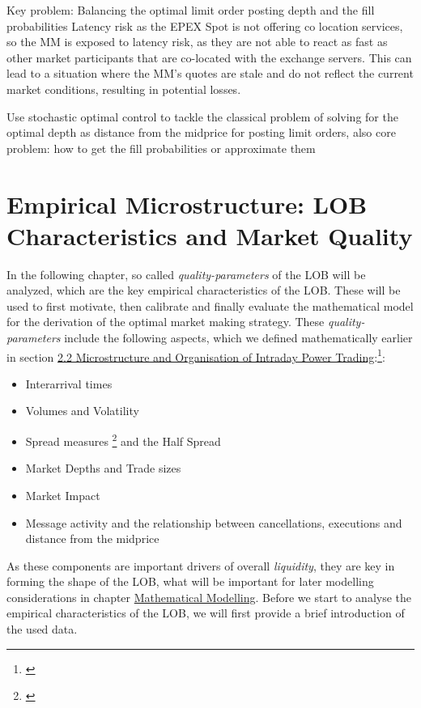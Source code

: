 \documentclass[12pt,a4paper]{cau_thesis}
\begin{document}
Key problem: Balancing the optimal limit order posting depth and the
fill probabilities Latency risk as the EPEX Spot is not offering co
location services, so the MM is exposed to latency risk, as they are
not able to react as fast as other market participants that are
co-located with the exchange servers. This can lead to a situation
where the MM's quotes are stale and do not reflect the current market
conditions, resulting in potential losses.

Use stochastic optimal control to tackle the classical problem of
solving for the optimal depth as distance from the midprice for
posting limit orders, also core problem: how to get the fill
probabilities or approximate them
\chapter{Empirical Microstructure: LOB Characteristics and Market Quality}\label{ch:empirical_characteristics}
In the following chapter, so called \textit{quality-parameters} of
the LOB will be analyzed, which are the key empirical characteristics
of the LOB. These will be used to first motivate, then calibrate and
finally evaluate the mathematical model for the derivation of the
optimal market making strategy. These \textit{quality-parameters}
include the following aspects, which we defined mathematically
earlier in section
\hyperref[sec:microstructure_and_organisation_of_power_trading]{2.2
    Microstructure and Organisation of Intraday Power
    Trading}:\footnote{\cite[See][, p.61.]{cartea2015algorithmic}}:
\begin{itemize}
    \item Interarrival times %
    \item Volumes and Volatility
    \item Spread measures \footnote{\cite[See ][, p.229]{balardy2022empirical}}
          and the Half Spread
    \item Market Depths and Trade sizes
    \item Market Impact
    \item Message activity and the relationship between cancellations,
          executions and distance from the midprice
\end{itemize}
As these components are important drivers of overall \emph{liquidity}, they are key
in forming the shape of the LOB, what will be important for later modelling considerations in
chapter \hyperref[ch:mathematical_modelling]{Mathematical Modelling}.
Before we start to analyse the empirical characteristics of the LOB, we
will first provide a brief introduction of the used data.
\end{document}
